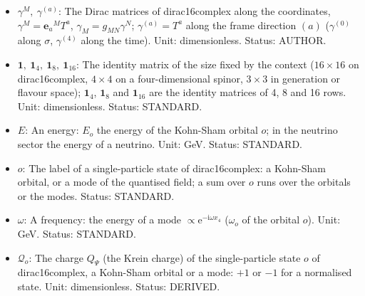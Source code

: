 \documentclass[
  10pt,
]{article}
\begin{document}
\begin{itemize}
  is real and antisymmetric. Unit: dimensionless. Status: AUTHOR.
\item
  \(\gamma^M,\ \gamma^{(a)}\): The Dirac matrices of dirac16complex
  along the coordinates, \(\gamma^M = \mathbf{e}_a{}^MT^a\),
  \(\gamma_M = g_{MN}\gamma^N\); \(\gamma^{(a)} = T^a\) along the frame
  direction \((a)\) (\(\gamma^{(0)}\) along \(\sigma\), \(\gamma^{(4)}\)
  along the time). Unit: dimensionless. Status: AUTHOR.
\item
  \(\mathbf{1},\ \mathbf{1}_4,\ \mathbf{1}_8,\ \mathbf{1}_{16}\): The
  identity matrix of the size fixed by the context (\(16 \times 16\) on
  dirac16complex, \(4 \times 4\) on a four-dimensional spinor,
  \(3 \times 3\) in generation or flavour space); \(\mathbf{1}_4\),
  \(\mathbf{1}_8\) and \(\mathbf{1}_{16}\) are the identity matrices of
  4, 8 and 16 rows. Unit: dimensionless. Status: STANDARD.
\item
  \(E\): An energy: \(E_o\) the energy of the Kohn-Sham orbital \(o\);
  in the neutrino sector the energy of a neutrino. Unit: GeV. Status:
  STANDARD.
\item
  \(o\): The label of a single-particle state of dirac16complex: a
  Kohn-Sham orbital, or a mode of the quantised field; a sum over \(o\)
  runs over the orbitals or the modes. Status: STANDARD.
\item
  \(\omega\): A frequency: the energy of a mode
  \(\propto \mathrm{e}^{-\mathrm{i}\omega x_4}\) (\(\omega_o\) of the
  orbital \(o\)). Unit: GeV. Status: STANDARD.
\item
  \(\mathcal{Q}_o\): The charge \(Q_\Psi\) (the Krein charge) of the
  single-particle state \(o\) of dirac16complex, a Kohn-Sham orbital or
  a mode: \(+1\) or \(-1\) for a normalised state. Unit: dimensionless.
  Status: DERIVED.
\end{itemize}
\end{document}
